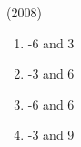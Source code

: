 \documentclass[journal]{IEEEtran}
\theoremstyle{remark}
\begin{document}
\begin{enumerate}[start=7]
\begin{enumerate}
\hfill (2008) \\
 \begin{multicols}{2}
  \begin{enumerate}
    \item -6 and 3
    \item -3 and 6 
    \item -6 and 6
    \item -3 and 9
  \end{enumerate}
 \end{multicols}

\end{enumerate}
\end{enumerate}
\end{document}
